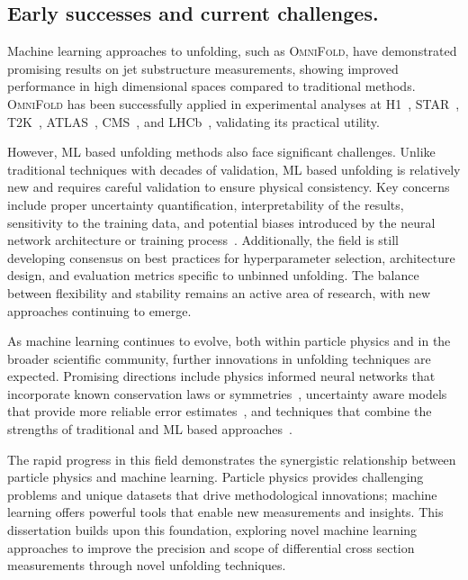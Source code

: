     \subsection{Early successes and current challenges.}
        Machine learning approaches to unfolding, such as \textsc{OmniFold}, have demonstrated promising results on jet substructure measurements, showing improved performance in high dimensional spaces compared to traditional methods.
        \textsc{OmniFold} has been successfully applied in experimental analyses at H1~\cite{collaboration_measurement_2022, collaboration_unbinned_2023, collaboration_machine_2024, Arratia2025TowardsEvents}, STAR~\cite{song_measurement_2023, pani_generalized_2024}, T2K~\cite{Huang2025MachineTechnique}, ATLAS~\cite{collaboration_simultaneous_2024, collaboration_measurement_2025}, CMS~\cite{collaboration_measurement_2025}, and LHCb~\cite{collaboration_multidifferential_2023}, validating its practical utility.

        However, ML based unfolding methods also face significant challenges.
        Unlike traditional techniques with decades of validation, ML based unfolding is relatively new and requires careful validation to ensure physical consistency.
        Key concerns include proper uncertainty quantification, interpretability of the results, sensitivity to the training data, and potential biases introduced by the neural network architecture or training process~\cite{mishra_uncertainty_2021}.
        Additionally, the field is still developing consensus on best practices for hyperparameter selection, architecture design, and evaluation metrics specific to unbinned unfolding.
        The balance between flexibility and stability remains an active area of research, with new approaches continuing to emerge.

        As machine learning continues to evolve, both within particle physics and in the broader scientific community, further innovations in unfolding techniques are expected.
        Promising directions include physics informed neural networks that incorporate known conservation laws or symmetries~\cite{raissi_physics-informed_2019}, uncertainty aware models that provide more reliable error estimates~\cite{brehmer_guide_2018}, and techniques that combine the strengths of traditional and ML based approaches~\cite{willard_integrating_2022}.
        
        The rapid progress in this field demonstrates the synergistic relationship between particle physics and machine learning.
        Particle physics provides challenging problems and unique datasets that drive methodological innovations;
        machine learning offers powerful tools that enable new measurements and insights.
        This dissertation builds upon this foundation, exploring novel machine learning approaches to improve the precision and scope of differential cross section measurements through novel unfolding techniques.

